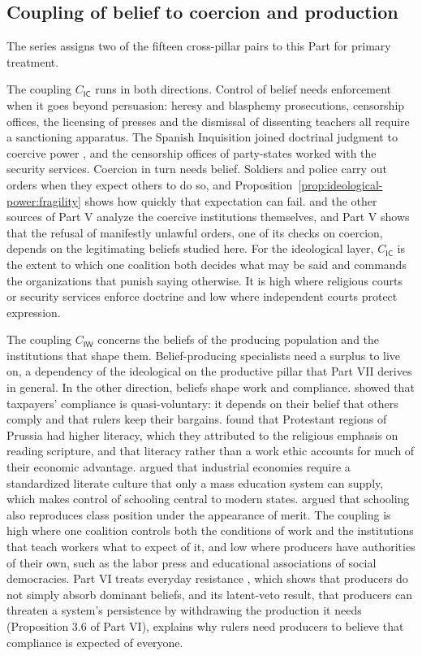\documentclass[11pt,letterpaper]{article}
\theoremstyle{definition}
\theoremstyle{remark}
\newcommand{\pI}{\mathsf{I}}
\newcommand{\pC}{\mathsf{C}}
\newcommand{\pW}{\mathsf{W}}
\begin{document}
\subsection{Coupling of belief to coercion and production}

The series assigns two of the fifteen cross-pillar pairs to this Part for primary treatment.

The coupling $C_{\pI\pC}$ runs in both directions. Control of belief needs enforcement when it goes beyond persuasion: heresy and blasphemy prosecutions, censorship offices, the licensing of presses and the dismissal of dissenting teachers all require a sanctioning apparatus. The Spanish Inquisition joined doctrinal judgment to coercive power \citep{kamen1997}, and the censorship offices of party-states worked with the security services. Coercion in turn needs belief. Soldiers and police carry out orders when they expect others to do so, and Proposition~\ref{prop:ideological-power:fragility} shows how quickly that expectation can fail. \citet{greitens2016} and the other sources of Part V analyze the coercive institutions themselves, and Part V shows that the refusal of manifestly unlawful orders, one of its checks on coercion, depends on the legitimating beliefs studied here. For the ideological layer, $C_{\pI\pC}$ is the extent to which one coalition both decides what may be said and commands the organizations that punish saying otherwise. It is high where religious courts or security services enforce doctrine and low where independent courts protect expression.

The coupling $C_{\pI\pW}$ concerns the beliefs of the producing population and the institutions that shape them. Belief-producing specialists need a surplus to live on, a dependency of the ideological on the productive pillar that Part VII derives in general. In the other direction, beliefs shape work and compliance. \citet{levi1988} showed that taxpayers' compliance is quasi-voluntary: it depends on their belief that others comply and that rulers keep their bargains. \citet{becker2009} found that Protestant regions of Prussia had higher literacy, which they attributed to the religious emphasis on reading scripture, and that literacy rather than a work ethic accounts for much of their economic advantage. \citet{gellner1983} argued that industrial economies require a standardized literate culture that only a mass education system can supply, which makes control of schooling central to modern states. \citet{bourdieu1977} argued that schooling also reproduces class position under the appearance of merit. The coupling is high where one coalition controls both the conditions of work and the institutions that teach workers what to expect of it, and low where producers have authorities of their own, such as the labor press and educational associations of social democracies. Part VI treats everyday resistance \citep{scott1985}, which shows that producers do not simply absorb dominant beliefs, and its latent-veto result, that producers can threaten a system's persistence by withdrawing the production it needs (Proposition 3.6 of Part VI), explains why rulers need producers to believe that compliance is expected of everyone.
\end{document}
